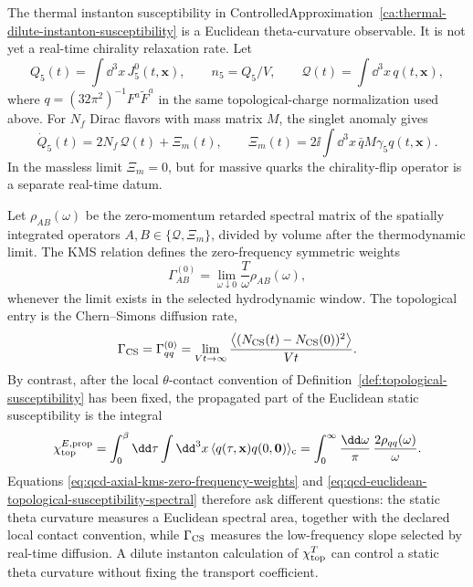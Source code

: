 \begin{controlledapproximation}
\label{ca:qcd-topological-diffusion-axial-relaxation}
The thermal instanton susceptibility in
ControlledApproximation~\ref{ca:thermal-dilute-instanton-susceptibility} is a
Euclidean theta-curvature observable.  It is not yet a real-time chirality
relaxation rate.  Let
\[
  Q_5(t)=\int\dd^3x\,J_5^0(t,\mathbf x),\qquad
  n_5=Q_5/V,\qquad
  \mathcal Q(t)=\int\dd^3x\,q(t,\mathbf x),
\]
where \(q=(32\pi^2)^{-1}F^a\widetilde F^a\) in the same topological-charge
normalization used above.  For \(N_f\) Dirac flavors with mass matrix \(M\),
the singlet anomaly gives
\begin{equation}
  \dot Q_5(t)
  =
  2N_f\,\mathcal Q(t)
  +
  \Xi_m(t),
  \qquad
  \Xi_m(t)=2\ii\int\dd^3x\,\bar q M\gamma_5 q(t,\mathbf x).
  \label{eq:qcd-axial-charge-anomaly-time}
\end{equation}
In the massless limit \(\Xi_m=0\), but for massive quarks the chirality-flip
operator is a separate real-time datum.

Let \(\rho_{AB}(\omega)\) be the zero-momentum retarded spectral matrix of the
spatially integrated operators \(A,B\in\{\mathcal Q,\Xi_m\}\), divided by
volume after the thermodynamic limit.  The KMS relation defines the
zero-frequency symmetric weights
\begin{equation}
  \Gamma_{AB}^{(0)}
  =
  \lim_{\omega\downarrow0}
  \frac{T}{\omega}\rho_{AB}(\omega),
  \label{eq:qcd-axial-kms-zero-frequency-weights}
\end{equation}
whenever the limit exists in the selected hydrodynamic window.  The topological
entry is the Chern--Simons diffusion rate,
\[
  \Gamma_{\rm CS}=\Gamma_{qq}^{(0)}
  =
  \lim_{Vt\to\infty}
  \frac{\left\langle
  (N_{\rm CS}(t)-N_{\rm CS}(0))^2\right\rangle}{Vt}.
\]
By contrast, after the local \(\theta\)-contact convention of
Definition~\ref{def:topological-susceptibility} has been fixed, the propagated
part of the Euclidean static susceptibility is the integral
\begin{equation}
  \chi_{\rm top}^{E,{\rm prop}}
  =
  \int_0^\beta\dd\tau\int\dd^3x\,
    \langle q(\tau,\mathbf x)q(0,\mathbf0)\rangle_{\rm c}
  =
  \int_0^\infty\frac{\dd\omega}{\pi}\,
    \frac{2\rho_{qq}(\omega)}{\omega}.
  \label{eq:qcd-euclidean-topological-susceptibility-spectral}
\end{equation}
Equations
\eqref{eq:qcd-axial-kms-zero-frequency-weights} and
\eqref{eq:qcd-euclidean-topological-susceptibility-spectral} therefore ask
different questions: the static theta curvature measures a Euclidean spectral
area, together with the declared local contact convention, while
\(\Gamma_{\rm CS}\) measures the low-frequency slope selected by real-time
diffusion.  A dilute instanton calculation of \(\chi_{\rm top}^{T}\) can
control a static theta curvature without fixing the transport coefficient.


\end{controlledapproximation}
